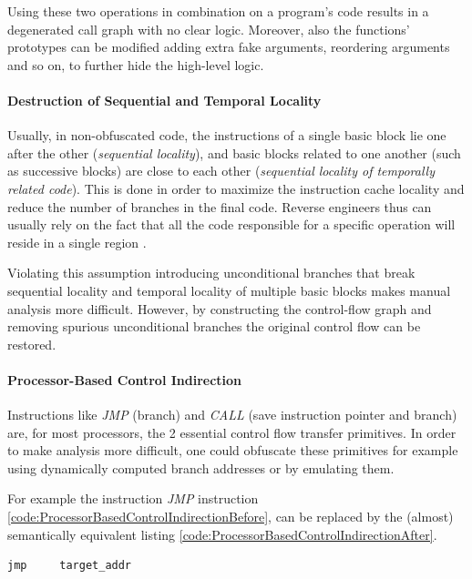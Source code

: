 \documentclass[pdfa%
,cucitura%
]{toptesi}
\begin{document}
Using these two operations in combination on a program's code results in a degenerated call graph with no clear logic. Moreover, also the functions' prototypes can be modified adding extra fake arguments, reordering arguments and so on, to further hide the high-level logic.

\paragraph{Destruction of Sequential and Temporal Locality}
Usually, in non-obfuscated code, the instructions of a single basic block lie one after the other (\textit{sequential locality}), and basic blocks related to one another (such as successive blocks) are close to each other (\textit{sequential locality of temporally related code}). This is done in order to maximize the instruction cache locality and reduce the number of branches in the final code. Reverse engineers thus can usually rely on the fact that all the code responsible for a specific operation will reside in a single region \cite{DangPRE}.

Violating this assumption introducing unconditional branches that break sequential locality and temporal locality of multiple basic blocks makes manual analysis more difficult. However, by constructing the control-flow graph and removing spurious unconditional branches the original control flow can be restored.

\paragraph{Processor-Based Control Indirection}
Instructions like \textit{JMP} (branch) and \textit{CALL} (save instruction pointer and branch) are, for most processors, the 2 essential control flow transfer primitives. In order to make analysis more difficult, one could obfuscate these primitives for example using dynamically computed branch addresses or by emulating them.

For example the instruction \textit{JMP} instruction \ref{code:ProcessorBasedControlIndirectionBefore}, can be replaced by the (almost) semantically equivalent listing \ref{code:ProcessorBasedControlIndirectionAfter}.

\begin{lstlisting}[caption={Processor-based control indirection before}, label=code:ProcessorBasedControlIndirectionBefore, language={[x86masm]Assembler}, style=mystyle]
	jmp		target_addr
\end{lstlisting}
\end{document}
